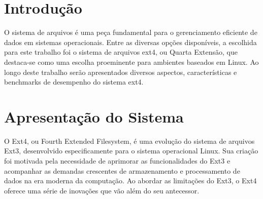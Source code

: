 \documentclass[
	12pt,				%
	openright,			%
	oneside,			%
	a4paper,			%
	chapter=TITLE,		%
	english,			%
	french,				%
	spanish,			%
	brazil				%
	]{abntex2}
\theoremstyle{definition}
\begin{document}
\frenchspacing 

\imprimircapa


\imprimirfolhaderosto

\newpage

\setlength{\absparsep}{18pt} %

\tableofcontents*
\cleardoublepage
\textual


\chapter{Introdução}
O sistema de arquivos é uma peça fundamental para o gerenciamento eficiente de dados em 
sistemas operacionais. Entre as diversas opções disponíveis, a escolhida para este trabalho 
foi o sistema de arquivos ext4, ou Quarta Extensão, que destaca-se como uma escolha proeminente para ambientes 
baseados em Linux. Ao longo deste trabalho serão apresentados diversos aspectos, características e benchmarks de desempenho 
do sistema ext4.

\chapter{Apresentação do Sistema}

O Ext4, ou Fourth Extended Filesystem, é uma evolução do sistema de arquivos Ext3, desenvolvido 
especificamente para o sistema operacional Linux. Sua criação foi motivada pela necessidade 
de aprimorar as funcionalidades do Ext3 e acompanhar as demandas crescentes de armazenamento e 
processamento de dados na era moderna da computação. Ao abordar as limitações do Ext3, o Ext4 
oferece uma série de inovações que vão além do seu antecessor.
\end{document}
